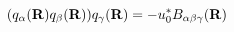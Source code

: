 \begin{equation}                      
(q_{\alpha}({\bf R}) q_{\beta}({\bf R})) q_{\gamma}({\bf R}) = - u_{0}^{*}                       
B_{\alpha \beta \gamma}({\bf R})                      
\end{equation} 
